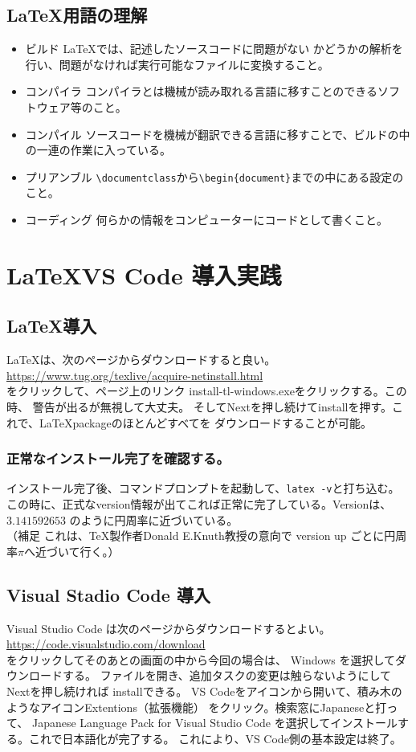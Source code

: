 \documentclass{ltjsarticle}
\begin{document}
\subsection{\LaTeX 用語の理解}
\begin{itemize}
  \item ビルド \LaTeX では、記述したソースコードに問題がない
        かどうかの解析を行い、問題がなければ実行可能なファイルに変換すること。
  \item コンパイラ コンパイラとは機械が読み取れる言語に移すことのできるソフトウェア等のこと。
  \item コンパイル ソースコードを機械が翻訳できる言語に移すことで、ビルドの中の一連の作業に入っている。
  \item プリアンブル \verb|\documentclass|から\verb|\begin{document}|までの中にある設定のこと。
  \item コーディング 何らかの情報をコンピューターにコードとして書くこと。
\end{itemize}
\section{\LaTeX VS Code 導入実践}

\subsection{\LaTeX 導入}
\LaTeX は、次のページからダウンロードすると良い。\\
\url{https://www.tug.org/texlive/acquire-netinstall.html}\\
をクリックして、ページ上のリンク install-tl-windows.exeをクリックする。この時、
警告が出るが無視して大丈夫。
そしてNextを押し続けてinstallを押す。これで、\LaTeX packageのほとんどすべてを
ダウンロードすることが可能。
\subsubsection*{正常なインストール完了を確認する。}
インストール完了後、コマンドプロンプトを起動して、\verb|latex -v|と打ち込む。
この時に、正式なversion情報が出てこれば正常に完了している。Versionは、$3.141592653$
のように円周率に近づいている。\\
（補足 これは、\TeX 製作者Donald E.Knuth教授の意向で
version up ごとに円周率$\pi$へ近づいて行く。）
\subsection{Visual Stadio Code 導入}
Visual Studio Code は次のページからダウンロードするとよい。\\
\url{https://code.visualstudio.com/download}\\
をクリックしてそのあとの画面の中から今回の場合は、
Windows を選択してダウンロードする。
ファイルを開き、追加タスクの変更は触らないようにしてNextを押し続ければ
installできる。
VS Codeをアイコンから開いて、積み木のようなアイコンExtentions（拡張機能）
をクリック。検索窓にJapaneseと打って、
Japanese Language Pack for Visual Studio Code
を選択してインストールする。これで日本語化が完了する。
これにより、VS Code側の基本設定は終了。
\end{document}

